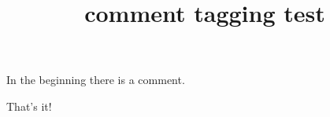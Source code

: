 \documentclass{article}
\title{comment tagging test}
\begin{document}
In the beginning there is a comment.

\begin{smalltt}
That's it!
\end{smalltt}
\end{document}
